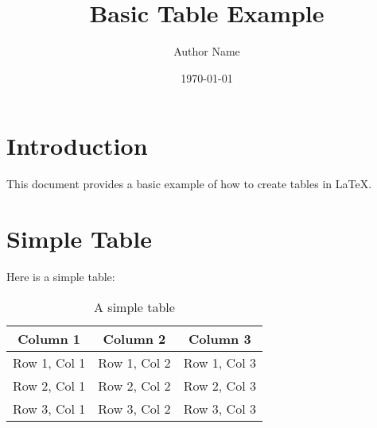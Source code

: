 \documentclass{article}
\begin{document}
\title{Basic Table Example}
\author{Author Name}
\date{\today}
\maketitle

\section{Introduction}
This document provides a basic example of how to create tables in LaTeX.

\section{Simple Table}
Here is a simple table:

\begin{table}[h!]
    \centering
    \tiny\begin{tabular}{|c|c|c|}
        \hline
        Column 1 & Column 2 & Column 3 \\
        \hline
        Row 1, Col 1 & Row 1, Col 2 & Row 1, Col 3 \\
        \hline
        Row 2, Col 1 & Row 2, Col 2 & Row 2, Col 3 \\
        \hline
        Row 3, Col 1 & Row 3, Col 2 & Row 3, Col 3 \\
        \hline
    \end{tabular}
    \caption{A simple table}
    \label{tab:simple_table}
\end{table}
\end{document}
